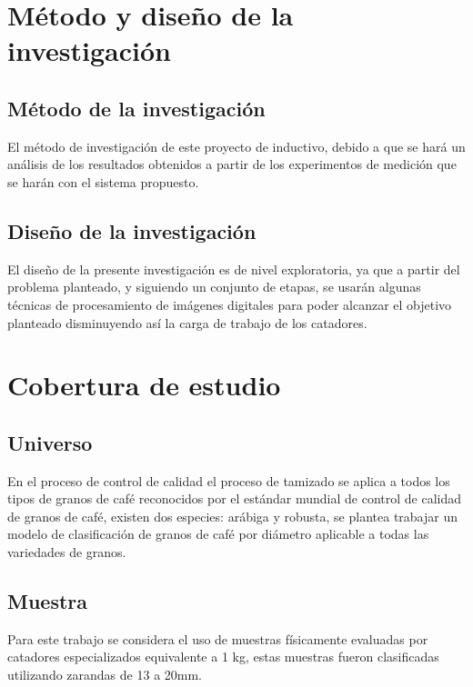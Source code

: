 \documentclass[12pt,a4paper,oneside]{book}
\begin{document}
\section{Método y diseño de la investigación}

\subsection{Método de la investigación}
El método de investigación de este proyecto de inductivo, debido a que se hará un análisis de los resultados obtenidos a partir de los experimentos de medición que se harán con el sistema propuesto.

\subsection{Diseño de la investigación}
El diseño de la presente investigación es de nivel exploratoria, ya que a partir del problema planteado, y siguiendo un conjunto de etapas, se usarán algunas técnicas de procesamiento de imágenes digitales para poder alcanzar el objetivo planteado disminuyendo así la carga de trabajo de los catadores.

\section{Cobertura de estudio}

\subsection{Universo}
En el proceso de control de calidad el proceso de tamizado se aplica a todos los tipos de granos de café reconocidos por el estándar mundial de control de calidad de granos de café,  existen dos especies: arábiga y robusta, se plantea trabajar un modelo de clasificación de granos de café por diámetro aplicable a todas las variedades de granos.

\subsection{Muestra}
Para este trabajo se considera el uso de muestras físicamente evaluadas por catadores especializados equivalente a 1 kg, estas muestras fueron clasificadas utilizando zarandas de 13 a 20mm.
\end{document}
